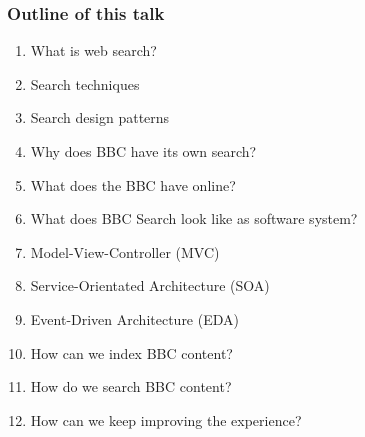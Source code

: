 \documentclass{beamer}
\begin{document}
\begin{frame}
  \frametitle{Outline of this talk}
  \begin{enumerate}
    \pause \item What is web search?
    \pause \item Search techniques
    \pause \item Search design patterns
    \pause \item Why does BBC have its own search?
    \pause \item What does the BBC have online?
    \pause \item What does BBC Search look like as software system?
    \pause \item Model-View-Controller (MVC)
    \pause \item Service-Orientated Architecture (SOA)
    \pause \item Event-Driven Architecture (EDA)
    \pause \item How can we index BBC content?
    \pause \item How do we search BBC content?
    \pause \item How can we keep improving the experience?
  \end{enumerate}
\end{frame}

\end{document}
